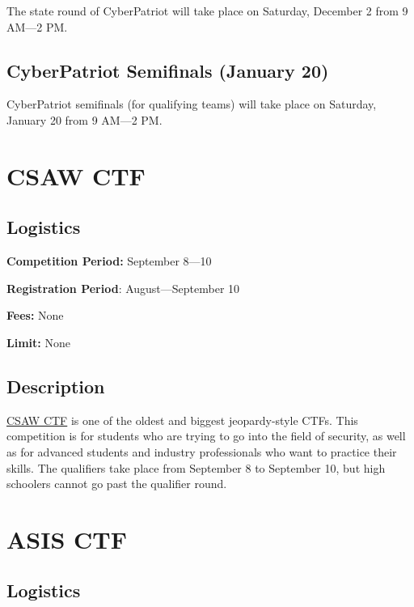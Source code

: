 \documentclass[
  letterpaper,
  DIV=11,
  numbers=noendperiod]{scrartcl}
\begin{document}
The state round of CyberPatriot will take place on Saturday, December 2
from 9 AM---2 PM.

\hypertarget{cyberpatriot-semifinals-january-20}{%
\subsection{CyberPatriot Semifinals (January
20)}\label{cyberpatriot-semifinals-january-20}}

CyberPatriot semifinals (for qualifying teams) will take place on
Saturday, January 20 from 9 AM---2 PM.

\hypertarget{csaw-ctf}{%
\section{CSAW CTF}\label{csaw-ctf}}

\hypertarget{logistics}{%
\subsection{Logistics}\label{logistics}}

\textbf{Competition Period:} September 8---10

\textbf{Registration Period}: August---September 10

\textbf{Fees:} None

\textbf{Limit:} None

\hypertarget{description}{%
\subsection{Description}\label{description}}

\href{https://www.csaw.io/ctf}{CSAW CTF} is one of the oldest and
biggest jeopardy-style CTFs. This competition is for students who are
trying to go into the field of security, as well as for advanced
students and industry professionals who want to practice their skills.
The qualifiers take place from September 8 to September 10, but high
schoolers cannot go past the qualifier round.

\hypertarget{asis-ctf}{%
\section{ASIS CTF}\label{asis-ctf}}

\hypertarget{logistics-1}{%
\subsection{Logistics}\label{logistics-1}}
\end{document}
